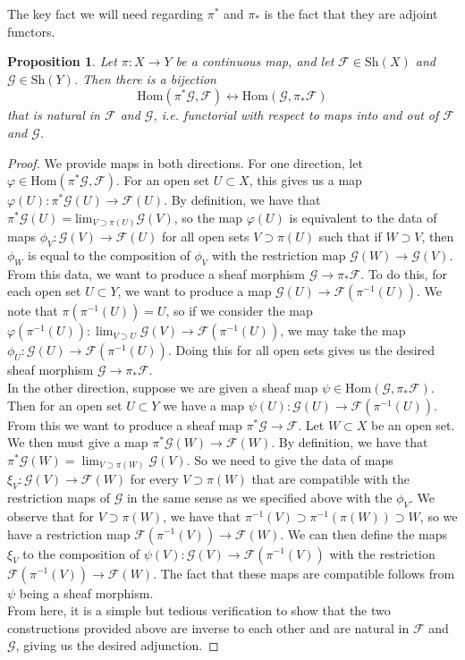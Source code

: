 \documentclass[psamsfonts, 12pt]{amsart}
\newtheorem{prop}[thm]{Proposition}
\theoremstyle{definition}
\theoremstyle{remark}
\renewcommand{\hom}{\mathrm{Hom}}
\newcommand{\inv}{^{-1}}
\begin{document}
%
The key fact we will need regarding $\pi^*$ and $\pi_*$ is the fact that they
are adjoint functors.
%
\begin{prop}
Let $\pi : X \to Y$ be a continuous map, and let $\mathcal{F} \in \mathrm{Sh}(X)$
and $\mathcal{G} \in \mathrm{Sh}(Y)$. Then there is a bijection
\[
\hom(\pi^*\mathcal{G},\mathcal{F}) \longleftrightarrow \hom(\mathcal{G},\pi_*\mathcal{F})
\]
that is natural in $\mathcal{F}$ and $\mathcal{G}$, i.e. functorial with respect to
maps into and out of $\mathcal{F}$ and $\mathcal{G}$.
\end{prop}
%
\begin{proof}
We provide maps in both directions. For one direction, let
$\varphi \in \hom(\pi^*\mathcal{G},\mathcal{F})$. For an open set $U \subset X$,
this gives us a map $\varphi(U) : \pi^*\mathcal{G}(U) \to \mathcal{F}(U)$.
By definition, we have that
$\pi^*\mathcal{G}(U) = \mathrm{lim}_{V\supset\pi(U)}\mathcal{G}(V)$, so the
map $\varphi(U)$ is equivalent to the data of maps
$\phi_V : \mathcal{G}(V) \to \mathcal{F}(U)$ for all open sets $V \supset \pi(U)$
such that if $W \supset V$, then $\phi_W$ is equal to the composition of $\phi_V$
with the restriction map $\mathcal{G}(W) \to \mathcal{G}(V)$. From this data,
we want to produce a sheaf morphism $\mathcal{G} \to \pi_*\mathcal{F}$. To do this,
for each open set $U \subset Y$,  we want to produce a map
$\mathcal{G}(U) \to \mathcal{F}(\pi\inv(U))$. We note that $\pi(\pi\inv(U)) = U$,
so if we consider the map
$\varphi(\pi\inv(U)) : \lim_{V \supset U}\mathcal{G}(V) \to \mathcal{F}(\pi\inv(U))$,
we may take the map $\phi_U : \mathcal{G}(U) \to \mathcal{F}(\pi\inv(U))$.
Doing this for all open sets gives us the desired sheaf morphism
$\mathcal{G} \to \pi_*\mathcal{F}$. \\

In the other direction, suppose we are given a sheaf map
$\psi \in \hom(\mathcal{G},\pi_*\mathcal{F})$. Then for an open set $U \subset Y$
we have a map $\psi(U) : \mathcal{G}(U) \to \mathcal{F}(\pi\inv(U))$. From this we
want to produce a sheaf map $\pi^*\mathcal{G} \to \mathcal{F}$. Let $W \subset X$
be an open set. We then must give a map $\pi^*\mathcal{G}(W) \to \mathcal{F}(W)$.
By definition, we have that
$\pi^*\mathcal{G}(W) = \lim_{V \supset \pi(W)}\mathcal{G}(V)$. So we
need to give the data of maps $\xi_V : \mathcal{G}(V) \to \mathcal{F}(W)$
for every $V \supset \pi(W)$ that are compatible with the restriction maps of
$\mathcal{G}$ in the same sense as we specified above with the $\phi_V$. We
observe that for $V \supset \pi(W)$, we have that
$\pi\inv(V) \supset \pi\inv(\pi(W)) \supset W$, so we have a restriction map
$\mathcal{F}(\pi\inv(V)) \to \mathcal{F}(W)$. We can then define the maps
$\xi_V$ to the composition of $\psi(V) : \mathcal{G}(V) \to \mathcal{F}(\pi\inv(V))$
with the restriction $\mathcal{F}(\pi\inv(V)) \to \mathcal{F}(W)$.
The fact that these maps are compatible follows from $\psi$ being a sheaf morphism. \\

From here, it is a simple but tedious verification to show that the two constructions
provided above are inverse to each other and are natural in $\mathcal{F}$ and
$\mathcal{G}$, giving us the desired adjunction.
 \end{proof}
\end{document}
